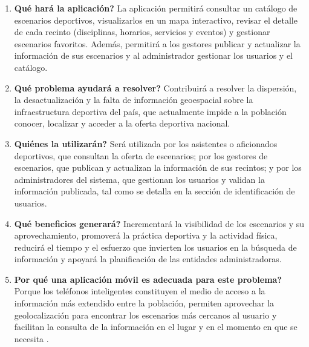 \begin{enumerate}
  \item \textbf{\textquestiondown Qu\'e har\'a la aplicaci\'on?} La aplicaci\'on
    permitir\'a consultar un cat\'alogo de escenarios deportivos, visualizarlos
    en un mapa interactivo, revisar el detalle de cada recinto (disciplinas,
    horarios, servicios y eventos) y gestionar escenarios favoritos. Adem\'as,
    permitir\'a a los gestores publicar y actualizar la informaci\'on de sus
    escenarios y al administrador gestionar los usuarios y el cat\'alogo.

  \item \textbf{\textquestiondown Qu\'e problema ayudar\'a a resolver?}
    Contribuir\'a a resolver la dispersi\'on, la desactualizaci\'on y la falta
    de informaci\'on geoespacial sobre la infraestructura deportiva del pa\'is,
    que actualmente impide a la poblaci\'on conocer, localizar y acceder a la
    oferta deportiva nacional.

  \item \textbf{\textquestiondown Qui\'enes la utilizar\'an?} Ser\'a utilizada
    por los asistentes o aficionados deportivos, que consultan la oferta de
    escenarios; por los gestores de escenarios, que publican y actualizan la
    informaci\'on de sus recintos; y por los administradores del sistema, que
    gestionan los usuarios y validan la informaci\'on publicada, tal como se
    detalla en la secci\'on de identificaci\'on de usuarios.

  \item \textbf{\textquestiondown Qu\'e beneficios generar\'a?} Incrementar\'a
    la visibilidad de los escenarios y su aprovechamiento, promover\'a la
    pr\'actica deportiva y la actividad f\'isica, reducir\'a el tiempo y el
    esfuerzo que invierten los usuarios en la b\'usqueda de informaci\'on y
    apoyar\'a la planificaci\'on de las entidades administradoras.

  \item \textbf{\textquestiondown Por qu\'e una aplicaci\'on m\'ovil es adecuada
    para este problema?} Porque los tel\'efonos inteligentes constituyen el medio
    de acceso a la informaci\'on m\'as extendido entre la poblaci\'on, permiten
    aprovechar la geolocalizaci\'on para encontrar los escenarios m\'as cercanos
    al usuario y facilitan la consulta de la informaci\'on en el lugar y en el
    momento en que se necesita \citep{pressman2010, longley2015}.
\end{enumerate}


